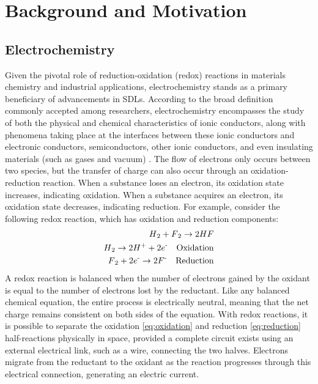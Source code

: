 \chapter{Background and Motivation} \label{chap:chap-1}



\section{Electrochemistry}
Given the pivotal role of reduction-oxidation (redox) reactions in materials chemistry and industrial applications, electrochemistry stands as a primary beneficiary of advancements in SDLs. According to the broad definition commonly accepted among researchers, electrochemistry encompasses the study of both the physical and chemical characteristics of ionic conductors, along with phenomena taking place at the interfaces between these ionic conductors and electronic conductors, semiconductors, other ionic conductors, and even insulating materials (such as gases and vacuum) \cite{Bagotsky2005}. The flow of electrons only occurs between two species, but the transfer of charge can also occur through an oxidation-reduction reaction. When a substance loses an electron, its oxidation state increases, indicating oxidation. When a substance acquires an electron, its oxidation state decreases, indicating reduction. For example, consider the following redox reaction, which has oxidation and reduction components:
\begin{align}
H\textsubscript{2} + F\textsubscript{2} \to 2HF \label{eq:reaction} \\
H\textsubscript{2} \to 2H\textsuperscript{+} + 2e\textsuperscript{-} \quad \text{Oxidation} \label{eq:oxidation}\\
F\textsubscript{2} + 2e\textsuperscript{-} \to 2F\textsuperscript{-} \quad 
\text{Reduction} \label{eq:reduction}
\end{align}
A redox reaction is balanced when the number of electrons gained by the oxidant is equal to the number of electrons lost by the reductant. Like any balanced chemical equation, the entire process is electrically neutral, meaning that the net charge remains consistent on both sides of the equation.
With redox reactions, it is possible to separate the oxidation \ref{eq:oxidation} and reduction \ref{eq:reduction} half-reactions physically in space, provided a complete circuit exists using an external electrical link, such as a wire, connecting the two halves. Electrons migrate from the reductant to the oxidant as the reaction progresses through this electrical connection, generating an electric current. 

